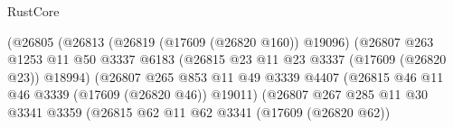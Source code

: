 \begin{lexlean}{RustCore}
\begin{coremodule}
                                            (@26805
                                              (@26813
                                                (@26819 (@17609 (@26820 @160)) @19096)
                                                (@26807
                                                  @263
                                                  @1253
                                                  @11
                                                  @50
                                                  @3337
                                                  @6183
                                                  (@26815
                                                    @23
                                                    @11
                                                    @23
                                                    @3337
                                                    (@17609 (@26820 @23))
                                                    @18994)
                                                  (@26807
                                                    @265
                                                    @853
                                                    @11
                                                    @49
                                                    @3339
                                                    @4407
                                                    (@26815
                                                      @46
                                                      @11
                                                      @46
                                                      @3339
                                                      (@17609 (@26820 @46))
                                                      @19011)
                                                    (@26807
                                                      @267
                                                      @285
                                                      @11
                                                      @30
                                                      @3341
                                                      @3359
                                                      (@26815
                                                        @62
                                                        @11
                                                        @62
                                                        @3341
                                                        (@17609 (@26820 @62))

\end{coremodule}
\end{lexlean}
